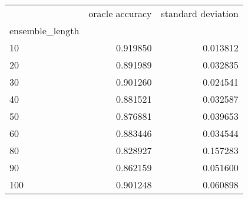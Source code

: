 \begin{tabular}{lrr}
\toprule
{} &  oracle accuracy &  standard deviation \\
ensemble\_length &                  &                     \\
\midrule
10              &         0.919850 &            0.013812 \\
20              &         0.891989 &            0.032835 \\
30              &         0.901260 &            0.024541 \\
40              &         0.881521 &            0.032587 \\
50              &         0.876881 &            0.039653 \\
60              &         0.883446 &            0.034544 \\
80              &         0.828927 &            0.157283 \\
90              &         0.862159 &            0.051600 \\
100             &         0.901248 &            0.060898 \\
\bottomrule
\end{tabular}
